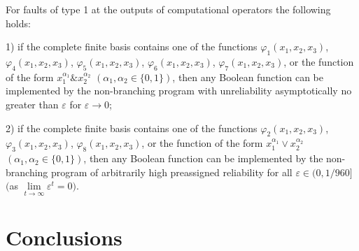 \documentclass[
11pt,%
tightenlines,%
twoside,%
onecolumn,%
nofloats,%
nobibnotes,%
nofootinbib,%
superscriptaddress,%
noshowpacs,%
centertags]%
{revtex4}
\begin{document}
\begin{corollary}\label{c2} For faults of type 1 at the outputs of computational operators the following holds:

1) if the complete finite basis contains one  of the functions
$\varphi_1(x_1, x_2, x_3)$, $\varphi_4(x_1, x_2, x_3)$,
$\varphi_5(x_1, x_2, x_3)$, $\varphi_6(x_1, x_2, x_3)$,
$\varphi_7(x_1, x_2, x_3)$, or the function of the form
$x_1^{\alpha_1}\& x_2^{\alpha_2}$  $(\alpha_1, \alpha_2\in\{0,
1\})$, then any Boolean function can be implemented by the
non-branching program with  unreliability asymptotically no greater
than $\varepsilon$ for $\varepsilon\to 0$;

2) if the complete finite basis contains one  of the functions
$\varphi_2(x_1, x_2, x_3)$, $\varphi_3(x_1, x_2, x_3)$,
$\varphi_8(x_1, x_2, x_3)$, or the function of the form
$x_1^{\alpha_1}\vee x_2^{\alpha_2}$$(\alpha_1, \alpha_2\in\{0,
1\})$, then any Boolean function can be implemented by the
non-branching program of arbitrarily high preassigned reliability
\linebreak  for all $\varepsilon\in(0, 1/960]$ $($as
$\lim\limits_{t\to\infty}\varepsilon^t=0)$.
\end{corollary}

\section{Conclusions}
\end{document}
